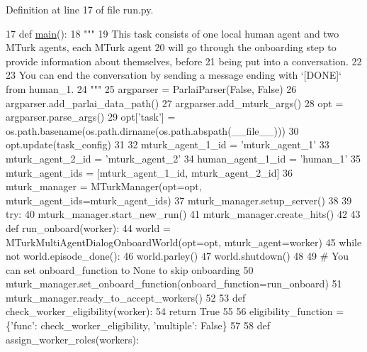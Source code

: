 Definition at line 17 of file run.\+py.


\begin{DoxyCode}
17 \textcolor{keyword}{def }\hyperlink{namespaceprojects_1_1wizard__of__wikipedia_1_1mturk__evaluation__task_1_1run_ad3ab2c71f8083c3112815c0b363d316b}{main}():
18     \textcolor{stringliteral}{"""}
19 \textcolor{stringliteral}{    This task consists of one local human agent and two MTurk agents, each MTurk agent}
20 \textcolor{stringliteral}{    will go through the onboarding step to provide information about themselves, before}
21 \textcolor{stringliteral}{    being put into a conversation.}
22 \textcolor{stringliteral}{}
23 \textcolor{stringliteral}{    You can end the conversation by sending a message ending with `[DONE]` from human\_1.}
24 \textcolor{stringliteral}{    """}
25     argparser = ParlaiParser(\textcolor{keyword}{False}, \textcolor{keyword}{False})
26     argparser.add\_parlai\_data\_path()
27     argparser.add\_mturk\_args()
28     opt = argparser.parse\_args()
29     opt[\textcolor{stringliteral}{'task'}] = os.path.basename(os.path.dirname(os.path.abspath(\_\_file\_\_)))
30     opt.update(task\_config)
31 
32     mturk\_agent\_1\_id = \textcolor{stringliteral}{'mturk\_agent\_1'}
33     mturk\_agent\_2\_id = \textcolor{stringliteral}{'mturk\_agent\_2'}
34     human\_agent\_1\_id = \textcolor{stringliteral}{'human\_1'}
35     mturk\_agent\_ids = [mturk\_agent\_1\_id, mturk\_agent\_2\_id]
36     mturk\_manager = MTurkManager(opt=opt, mturk\_agent\_ids=mturk\_agent\_ids)
37     mturk\_manager.setup\_server()
38 
39     \textcolor{keywordflow}{try}:
40         mturk\_manager.start\_new\_run()
41         mturk\_manager.create\_hits()
42 
43         \textcolor{keyword}{def }run\_onboard(worker):
44             world = MTurkMultiAgentDialogOnboardWorld(opt=opt, mturk\_agent=worker)
45             \textcolor{keywordflow}{while} \textcolor{keywordflow}{not} world.episode\_done():
46                 world.parley()
47             world.shutdown()
48 
49         \textcolor{comment}{# You can set onboard\_function to None to skip onboarding}
50         mturk\_manager.set\_onboard\_function(onboard\_function=run\_onboard)
51         mturk\_manager.ready\_to\_accept\_workers()
52 
53         \textcolor{keyword}{def }check\_worker\_eligibility(worker):
54             \textcolor{keywordflow}{return} \textcolor{keyword}{True}
55 
56         eligibility\_function = \{\textcolor{stringliteral}{'func'}: check\_worker\_eligibility, \textcolor{stringliteral}{'multiple'}: \textcolor{keyword}{False}\}
57 
58         \textcolor{keyword}{def }assign\_worker\_roles(workers):

\end{DoxyCode}
